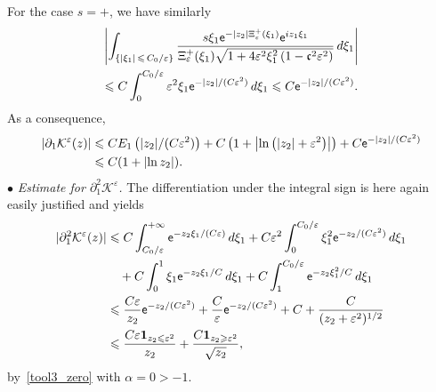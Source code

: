 \documentclass[10pt]{amsart}
\theoremstyle{definition}\newtheorem{defi}[theo]{Definition}\newtheorem{rema}[theo]{Remark}\newtheorem{exam}[theo]{Example}\newtheorem{exem}[theo]{Example}\newtheorem{nota}[theo]{Notation}
\newcommand*\p{\partial}
\newcommand*\BK{\mathcal{K}}
\newcommand{\bfun}{\mathbf{1}}
\newcommand*\ex{{\sf e}}
\newcommand*\cs{{\mathfrak c}}
\newcommand*\ii{\infty}
\newcommand*\gs{\geqslant }
\newcommand*\ls{\leqslant }
\newcommand*\e{\varepsilon}
\begin{document}
For the case $ s= + $, we have similarly
\begin{multline*}
\left\lvert  \int_{\left\{\lvert \xi_1 \rvert \,\ls\,C_0 /\e \right\}}
\frac{ s \xi_1 \ex^{- |z_2| \Xi_\e^+ (\xi_1)} \ex^{i z_1 \xi_1} }{\Xi_\e^+ (\xi_1)
\sqrt{1 + 4\e^2 \xi_1^2 \left(1 - \cs^2 \e^2\right)}} \, d\xi_1 \right\rvert
\\
\ls C \int_{0}^{C_0/ \e} \e^{2} \xi_1 \ex^{- |z_2| /(C\e^{2}) } \, d \xi_1
\ls C \ex^{- |z_2| /(C\e^{2})}.
\end{multline*}
As a consequence,
\begin{align*}
\left\lvert \p_1 \BK^\e (z) \right\rvert & \ls C E_1 \left(|z_2|/ (C\e^2)\right) + C \left(1 + \left\lvert \ln \left(|z_2| +\e^2\right) \right\rvert\right) + C \ex^{- |z_2| /(C\e^{2}) }
\\ &
\ls C (1 + \lvert \ln z_2 \rvert).
\end{align*}
$ \bullet $ \emph{Estimate for $ \p_1^2 \BK^\e $.} The differentiation under the integral sign is here again easily justified and yields
\begin{align}\label{K11_zero}
\lvert \p_1^2 \BK^\e (z) \rvert &
\ls C \int_{ C_0/ \e }^{+\ii} \ex^{- z_2 \xi_1/ (C \e)} \, d\xi_1 + C \e^2 \int_0^{ C_0/ \e } \xi_1^2 \ex^{- z_2 / (C \e^2) } \, d\xi_1
\nonumber \\ & \quad + C \int_0^{1} \xi_1 \ex^{- z_2 \xi_1 / C } \, d\xi_1 + C \int_1^{ C_0/ \e } \ex^{- z_2 \xi_1^2 / C } \, d\xi_1
\\ &
\ls \frac{C \e}{z_2} \ex^{- z_2 / (C \e^2) } + \frac{C }{\e} \ex^{- z_2 / (C \e^2) } + C + \frac{C}{ (z_2 + \e^2)^{1/2}}
\nonumber \\ &
\nonumber \ls
\frac{C \e \bfun_{z_2 \ls \e^2 }}{ z_2 } + \frac{C \bfun_{z_2 \gs \e^2 }}{ \sqrt{z_2} },
\end{align}
by~\eqref{tool3_zero} with $ \alpha = 0 > - 1 $.
\vspace*{4pt}
\end{document}
